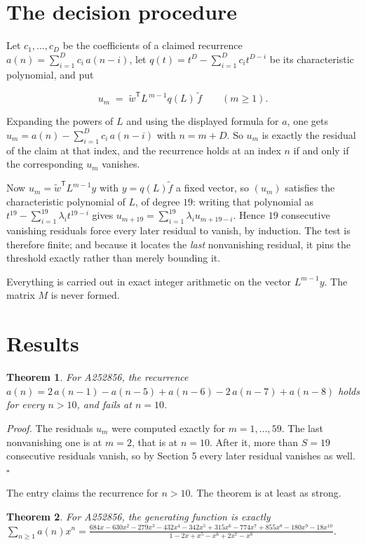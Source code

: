 \documentclass[11pt]{article}
\newtheorem{theorem}{Theorem}
\theoremstyle{definition}
\begin{document}
\section{The decision procedure}

Let $c_1,\dots,c_D$ be the coefficients of a claimed recurrence $a(n) = \sum_{i=1}^{D} c_i\,a(n-i)$, let $q(t) = t^{D} - \sum_{i=1}^{D} c_i t^{D-i}$ be its characteristic polynomial, and put

\[u_m \;=\; \tilde w^{\mathsf T} L^{\,m-1} q(L)\,\tilde f \qquad (m \ge 1).\]

Expanding the powers of $L$ and using the displayed formula for $a$, one gets $u_m = a(n) - \sum_{i=1}^{D} c_i\,a(n-i)$ with $n = m + D$. So $u_m$ is exactly the residual of the claim at that index, and the recurrence holds at an index $n$ if and only if the corresponding $u_m$ vanishes.

Now $u_m = \tilde w^{\mathsf T} L^{m-1} y$ with $y = q(L)\tilde f$ a fixed vector, so $(u_m)$ satisfies the characteristic polynomial of $L$, of degree $19$: writing that polynomial as $t^{19} - \sum_{i=1}^{19} \lambda_i t^{19-i}$ gives $u_{m+19} = \sum_{i=1}^{19} \lambda_i u_{m+19-i}$. Hence $19$ consecutive vanishing residuals force every later residual to vanish, by induction. The test is therefore finite; and because it locates the {\itshape last} nonvanishing residual, it pins the threshold exactly rather than merely bounding it.

Everything is carried out in exact integer arithmetic on the vector $L^{m-1}y$. The matrix $M$ is never formed.

\section{Results}

\begin{theorem} For A252856, the recurrence $a(n) = 2\,a(n-1) - a(n-5) + a(n-6) - 2\,a(n-7) + a(n-8)$ holds for every $n > 10$, and fails at $n = 10$.\end{theorem}

{\itshape Proof.} The residuals $u_m$ were computed exactly for $m = 1,\dots,59$. The last nonvanishing one is at $m = 2$, that is at $n = 10$. After it, more than $S = 19$ consecutive residuals vanish, so by Section 5 every later residual vanishes as well. $\square$

The entry claims the recurrence for $n > 10$. The theorem is at least as strong.

\begin{theorem} For A252856, the generating function is exactly $\sum_{n\ge 1} a(n)x^n = \frac{684x - 630x^{2} - 279x^{3} - 432x^{4} - 342x^{5} + 315x^{6} - 774x^{7} + 855x^{8} - 180x^{9} - 18x^{10}}{1 - 2x + x^{5} - x^{6} + 2x^{7} - x^{8}}$.\end{theorem}
\end{document}

